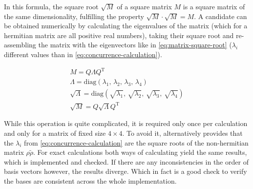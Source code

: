 In this formula, the square root $\sqrt{M}$ of a square matrix $M$ is a square matrix of the same dimensionality, fulfilling the property $\sqrt{M}\cdot \sqrt{M} = M$.
A candidate can be obtained numerically by calculating the eigenvalues of the matrix (which for a hermitian matrix are all positive real numbers), taking their square root and re-assembling the matrix with the eigenvectors like in \autoref{eq:matrix-square-root} ($\lambda_i$ different values than in \autoref{eq:concurrence-calculation}).

\begin{equation}
    \label{eq:matrix-square-root}
    \begin{gathered}
        M  = Q \Lambda Q^\text{T}\\
        \Lambda = \text{diag}(\lambda_1,\, \lambda_2,\, \lambda_3,\, \lambda_4)\\
        \sqrt{\Lambda} = \text{diag}(\sqrt{\lambda_1},\, \sqrt{\lambda_2},\,\sqrt{\lambda_3},\,\sqrt{\lambda_4})\\
        \sqrt{M}  = Q \sqrt{\Lambda} Q^\text{T}
    \end{gathered}
\end{equation}

While this operation is quite complicated, it is required only once per calculation and only for a matrix of fixed size $4\times 4$.
To avoid it, \cite{concurrenceRewording} alternatively provides that the $\lambda_i$ from \autoref{eq:concurrence-calculation} are the square roots of the non-hermitian matrix $\rho \tilde{\rho}$.
For exact calculations both ways of calculating yield the same results, which is implemented and checked. 
If there are any inconsistencies in the order of basis vectors however, the results diverge. Which in fact is a good check to verify the bases are consistent across the whole implementation.
